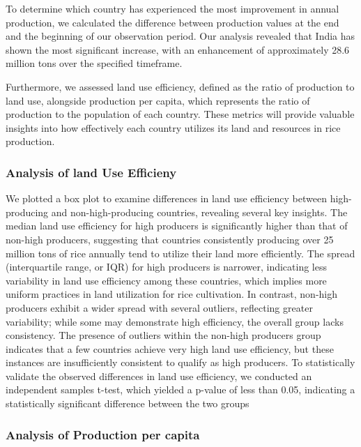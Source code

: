 \documentclass[
  man]{apa6}
\begin{document}
To determine which country has experienced the most improvement in annual production, we calculated the difference between production values at the end and the beginning of our observation period. Our analysis revealed that India has shown the most significant increase, with an enhancement of approximately 28.6 million tons over the specified timeframe.

Furthermore, we assessed land use efficiency, defined as the ratio of production to land use, alongside production per capita, which represents the ratio of production to the population of each country. These metrics will provide valuable insights into how effectively each country utilizes its land and resources in rice production.

\subsubsection{Analysis of land Use Efficieny}\label{analysis-of-land-use-efficieny}

We plotted a box plot to examine differences in land use efficiency between high-producing and non-high-producing countries, revealing several key insights. The median land use efficiency for high producers is significantly higher than that of non-high producers, suggesting that countries consistently producing over 25 million tons of rice annually tend to utilize their land more efficiently. The spread (interquartile range, or IQR) for high producers is narrower, indicating less variability in land use efficiency among these countries, which implies more uniform practices in land utilization for rice cultivation. In contrast, non-high producers exhibit a wider spread with several outliers, reflecting greater variability; while some may demonstrate high efficiency, the overall group lacks consistency. The presence of outliers within the non-high producers group indicates that a few countries achieve very high land use efficiency, but these instances are insufficiently consistent to qualify as high producers. To statistically validate the observed differences in land use efficiency, we conducted an independent samples t-test, which yielded a p-value of less than 0.05, indicating a statistically significant difference between the two groups

\subsubsection{Analysis of Production per capita}\label{analysis-of-production-per-capita}
\end{document}
